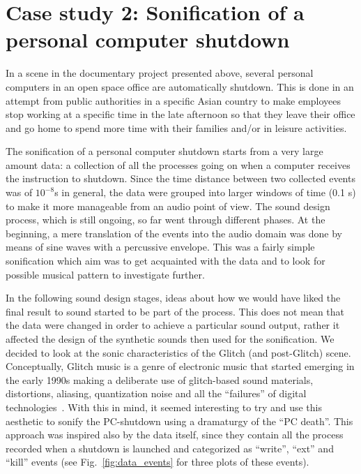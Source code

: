 \documentclass[manuscript,screen]{acmart}
\begin{document}
\section{Case study 2: Sonification of a personal computer shutdown}\label{sec:case2}

In a scene in the documentary project presented above, several personal computers in an open space office are automatically shutdown. This is done in an attempt from public authorities in a specific Asian country to make employees stop working at a specific time in the late afternoon so that they leave their office and go home to spend more time with their families and/or in leisure activities. 

The sonification of a personal computer shutdown starts from a very large amount data: a collection of all the processes going on when a computer receives the instruction to shutdown. Since the time distance between two collected events was of $10^{-8}$s in general, the data were grouped into larger windows of time (0.1 s) to make it more manageable from an audio point of view.
The sound design process, which is still ongoing, so far went through different phases. At the beginning, a mere translation of the events into the audio domain was done by means of sine waves with a percussive envelope. This was a fairly simple sonification which aim was to get acquainted with the data and to look for possible musical pattern to investigate further.


In the following sound design stages, ideas about how we would have liked the final result to sound started to be part of the process. This does not mean that the data were changed in order to achieve a particular sound output, rather it affected the design of the synthetic sounds then used for the sonification.
We decided to look at the sonic characteristics of the Glitch (and post-Glitch) scene. Conceptually, Glitch music is a genre of electronic music that started emerging in the  early 1990s making a deliberate use of glitch-based sound materials, distortions, aliasing, quantization noise and all the ``failures'' of digital technologies~\cite{cascone2000aesthetics}. With this in mind, it seemed interesting to try and use this aesthetic to sonify the PC-shutdown using a dramaturgy of the ``PC death''. This approach was inspired also by the data itself, since they contain all the process recorded when a shutdown is launched and categorized as “write”, “ext” and “kill” events (see Fig.~\ref{fig:data_events} for three plots of these events).
\end{document}
